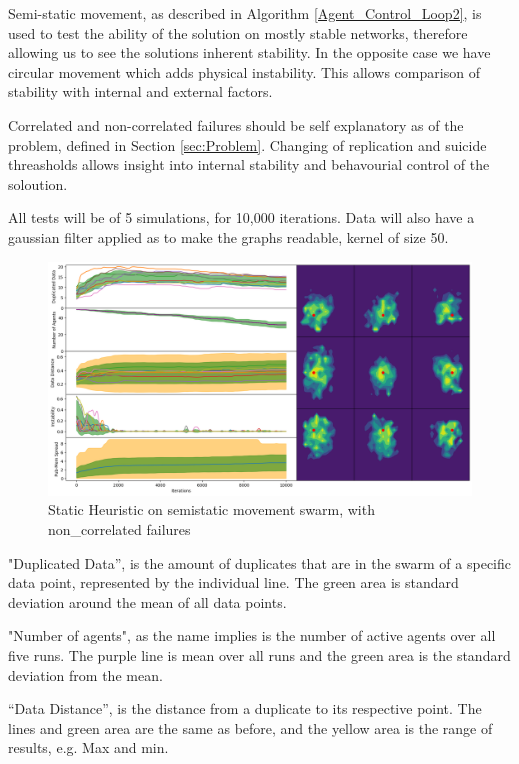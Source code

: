 \documentclass{UoYCSproject}
\begin{document}
Semi-static movement, as described in Algorithm \ref{Agent_Control_Loop2}, is used to test the ability of the solution on mostly stable networks, therefore allowing us to see the solutions inherent stability. 
In the opposite case we have circular movement which adds physical instability. 
This allows comparison of stability with internal and external factors.

Correlated and non-correlated failures should be self explanatory as of the problem, defined in Section \ref{sec:Problem}. 
Changing of replication and suicide threasholds allows insight into internal stability and behavourial control of the soloution.

All tests will be of 5 simulations, for 10,000 iterations. 
Data will also have a gaussian filter applied as to make the graphs readable, kernel of size 50. 

\begin{figure}[htb]
\label{fig:static_movement_non}
\begin{center}
\centering
\includegraphics[width=\linewidth]{"./Static_Heuristic/Static_Movement_non.png"}
\caption{Static Heuristic on semi\-static movement swarm, with non\_correlated failures}
\end{center}
\end{figure}

"Duplicated Data”, is the amount of duplicates that are in the swarm of a specific data point, represented by the individual line. 
The green area is standard deviation around the mean of all data points.

"Number of agents", as the name implies is the number of active agents over all five runs.
The purple line is mean over all runs and the green area is the standard deviation from the mean.

“Data Distance”, is the distance from a duplicate to its respective point. 
The lines and green area are the same as before, and the yellow area is the range of results, e.g. Max and min.
\end{document}
